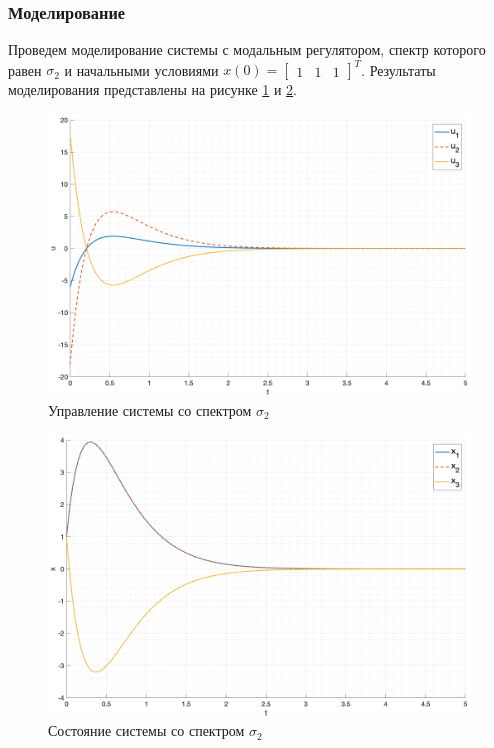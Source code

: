 \subsubsection{Моделирование}
Проведем моделирование системы с модальным регулятором, спектр которого равен $\sigma_2$ и начальными условиями $x(0) = \begin{bmatrix} 1 & 1 & 1 \end{bmatrix}^T$.
Результаты моделирования представлены на рисунке \ref{fig:task1_u_2} и \ref{fig:task1_x_2}.
\begin{figure}[ht!]
    \centering
    \includegraphics[width=\textwidth]{media/plots/task1_u_2.png}
    \caption{Управление системы со спектром $\sigma_2$}
    \label{fig:task1_u_2}
\end{figure}
\begin{figure}
    \centering
    \includegraphics[width=\textwidth]{media/plots/task1_x_2.png}
    \caption{Состояние системы со спектром $\sigma_2$}
    \label{fig:task1_x_2}
\end{figure}

